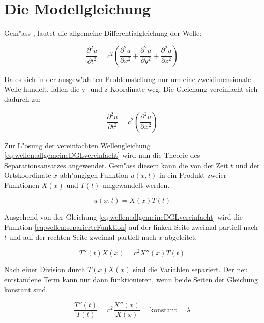 \section{Die Modellgleichung}
Gem"ass \cite{wellen:smirnow2}, lautet die allgemeine Differentialgleichung der 
Welle:

\begin{equation*}
	\frac{\partial^2 u}{\partial t^2}
	=
	c^2
	\left(
		\frac{\partial^2 u}{\partial x^2} 
		+ \frac{\partial^2 u}{\partial y^2} 
		+ \frac{\partial^2 u}{\partial z^2}
	\right)
	\label{eq:wellen:allgemeineDGL}
\end{equation*}

Da es sich in der ausgew"ahlten Problemstellung nur um eine zweidimensionale 
Welle handelt, fallen die y- und z-Koordinate weg. Die Gleichung vereinfacht 
sich dadurch zu:

\begin{equation}
	\frac{\partial^2 u}{\partial t^2}
	=
	c^2
	\left(
		\frac{\partial^2 u}{\partial x^2} 
	\right)
	\label{eq:wellen:allgemeineDGLvereinfacht}
\end{equation}

Zur L"osung der vereinfachten Wellengleichung 
\ref{eq:wellen:allgemeineDGLvereinfacht} wird nun die Theorie des 
Separationsansatzes angewendet. Gem"ass diesem kann die von der Zeit $t$ und 
der Ortskoordinate $x$ abh"angigen Funktion $u(x,t)$ in ein Produkt 
zweier Funktionen $X(x)$ und $T(t)$ umgewandelt werden.

\begin{equation}
	u (x,t) = X(x) T(t)
	\label{eq:wellen:separierteFunktion}
\end{equation}

Ausgehend von der Gleichung \ref{eq:wellen:allgemeineDGLvereinfacht} wird die 
Funktion \ref{eq:wellen:separierteFunktion} auf der linken Seite zweimal 
partiell nach $t$ und auf der rechten Seite zweimal partiell nach $x$ 
abgeleitet:

\begin{equation*}
	T''(t) X(x) = c^2 X''(x)T(t)
\end{equation*}

Nach einer Division durch $T(x)X(x)$ sind die Variablen separiert. Der neu 
entstandene Term kann nur dann funktionieren, wenn beide Seiten der Gleichung 
konstant sind.

\begin{equation*}
	\frac{T''(t)}{T(t)}
	=
	c^2 \frac{X''(x)}{X(x)} = \text{konstant} = \lambda
\end{equation*}

